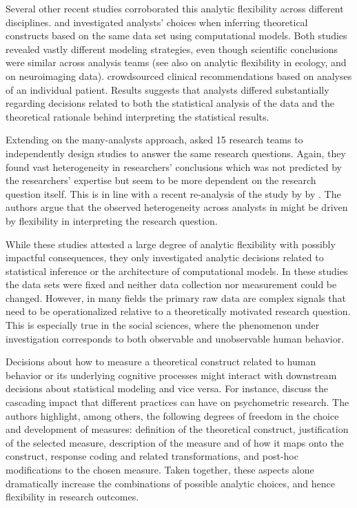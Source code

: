 \documentclass[Review,times,sageh]{sagej}
\begin{document}
Several other recent studies corroborated this analytic flexibility
across different disciplines. \citet{dutilh2019} and
\citet{starns2019assessing} investigated analysts' choices when
inferring theoretical constructs based on the same data set using
computational models. Both studies revealed vastly different modeling
strategies, even though scientific conclusions were similar across
analysis teams (see also \citet{Parker2020} on analytic flexibility in
ecology, and \citet{botvinik-nezer2020} on neuroimaging data).
\citet{bastiaansen2020} crowdsourced clinical recommendations based on
analyses of an individual patient. Results suggests that analysts
differed substantially regarding decisions related to both the
statistical analysis of the data and the theoretical rationale behind
interpreting the statistical results.

Extending on the many-analysts approach, \citet{landy2018crowdsourcing}
asked 15 research teams to independently design studies to answer the
same research questions. Again, they found vast heterogeneity in
researchers' conclusions which was not predicted by the researchers'
expertise but seem to be more dependent on the research question itself.
This is in line with a recent re-analysis of the study by
\citet{silberzahn2018many} by \citet{auspurg2021has}. The authors argue
that the observed heterogeneity across analysts in
\citet{silberzahn2018many} might be driven by flexibility in
interpreting the research question.

While these studies attested a large degree of analytic flexibility with
possibly impactful consequences, they only investigated analytic
decisions related to statistical inference or the architecture of
computational models. In these studies the data sets were fixed and
neither data collection nor measurement could be changed. However, in
many fields the primary raw data are complex signals that need to be
operationalized relative to a theoretically motivated research question.
This is especially true in the social sciences, where the phenomenon
under investigation corresponds to both observable and unobservable
human behavior.

Decisions about how to measure a theoretical construct related to human
behavior or its underlying cognitive processes might interact with
downstream decisions about statistical modeling and vice versa. For
instance, \citet{flake2020} discuss the cascading impact that different
practices can have on psychometric research. The authors highlight,
among others, the following degrees of freedom in the choice and
development of measures: definition of the theoretical construct,
justification of the selected measure, description of the measure and of
how it maps onto the construct, response coding and related
transformations, and post-hoc modifications to the chosen measure. Taken
together, these aspects alone dramatically increase the combinations of
possible analytic choices, and hence flexibility in research outcomes.
\end{document}
